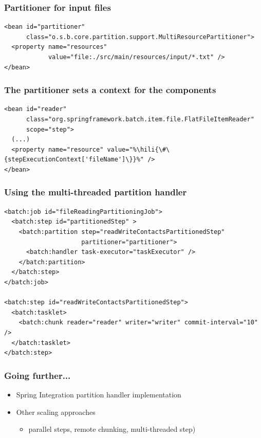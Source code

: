 \begin{frame}[fragile]
\frametitle{Partitioner for input files}
\lstset{language=XML}
\begin{lstlisting}
<bean id="partitioner"
      class="o.s.b.core.partition.support.MultiResourcePartitioner">
  <property name="resources" 
            value="file:./src/main/resources/input/*.txt" />
</bean>
\end{lstlisting}
\end{frame}

\begin{frame}[fragile]
\frametitle{The partitioner sets a context for the components}

\lstset{language=XML}
\begin{lstlisting}
<bean id="reader" 
      class="org.springframework.batch.item.file.FlatFileItemReader" 
      scope="step">
  (...)
  <property name="resource" value="%\hili{\#\{stepExecutionContext['fileName']\}}%" />
</bean>
\end{lstlisting}
\end{frame}

\begin{frame}[fragile]
 \frametitle{Using the multi-threaded partition handler}
 \lstset{language=XML}
 \begin{lstlisting}
<batch:job id="fileReadingPartitioningJob">
  <batch:step id="partitionedStep" >
    <batch:partition step="readWriteContactsPartitionedStep"
                     partitioner="partitioner">
      <batch:handler task-executor="taskExecutor" />
    </batch:partition>
  </batch:step>
</batch:job>

<batch:step id="readWriteContactsPartitionedStep">
  <batch:tasklet>    
    <batch:chunk reader="reader" writer="writer" commit-interval="10" />
  </batch:tasklet>	
</batch:step>
 \end{lstlisting}
\end{frame}

\begin{frame}
 \frametitle{Going further...}
 \begin{itemize}
  \item Spring Integration partition handler implementation
  \item Other scaling approaches
  \begin{itemize}
   \item parallel steps, remote chunking, multi-threaded step)
  \end{itemize}  
 \end{itemize}
\end{frame}

